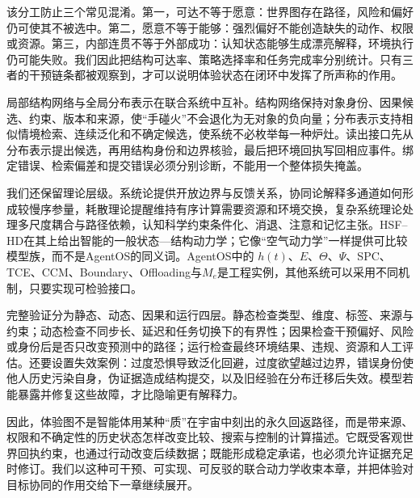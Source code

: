 该分工防止三个常见混淆。第一，可达不等于愿意：世界图存在路径，风险和偏好仍可使其不被选中。第二，愿意不等于能够：强烈偏好不能创造缺失的动作、权限或资源。第三，内部连贯不等于外部成功：认知状态能够生成漂亮解释，环境执行仍可能失败。我们因此把结构可达率、策略选择率和任务完成率分别统计。只有三者的干预链条都被观察到，才可以说明体验状态在闭环中发挥了所声称的作用。

局部结构网络与全局分布表示在联合系统中互补。结构网络保持对象身份、因果候选、约束、版本和来源，使“手碰火”不会退化为无对象的负向量；分布表示支持相似情境检索、连续泛化和不确定候选，使系统不必枚举每一种炉灶。读出接口先从分布表示提出候选，再用结构身份和边界核验，最后把环境回执写回相应事件。绑定错误、检索偏差和提交错误必须分别诊断，不能用一个整体损失掩盖。

我们还保留理论层级。系统论提供开放边界与反馈关系，协同论解释多通道如何形成较慢序参量，耗散理论提醒维持有序计算需要资源和环境交换，复杂系统理论处理多尺度耦合与路径依赖，认知科学约束条件化、消退、注意和记忆主张。HSF--HD在其上给出智能的一般状态—结构动力学；它像“空气动力学”一样提供可比较模型族，而不是AgentOS的同义词。AgentOS中的 $h(t)$、$E$、$\Theta$、$\Psi$、SPC、TCE、CCM、Boundary、Offloading与$M_e$是工程实例，其他系统可以采用不同机制，只要实现可检验接口。

完整验证分为静态、动态、因果和运行四层。静态检查类型、维度、标签、来源与约束；动态检查不同步长、延迟和任务切换下的有界性；因果检查干预偏好、风险或身份后是否只改变预测中的路径；运行检查最终环境结果、违规、资源和人工评估。还要设置失效案例：过度恐惧导致泛化回避，过度欲望越过边界，错误身份使他人历史污染自身，伪证据造成结构提交，以及旧经验在分布迁移后失效。模型若能暴露并修复这些故障，才比隐喻更有解释力。

因此，体验图不是智能体用某种“质”在宇宙中刻出的永久回返路径，而是带来源、权限和不确定性的历史状态怎样改变比较、搜索与控制的计算描述。它既受客观世界回执约束，也通过行动改变后续数据；既能形成稳定承诺，也必须允许证据充足时修订。我们以这种可干预、可实现、可反驳的联合动力学收束本章，并把体验对目标协同的作用交给下一章继续展开。
